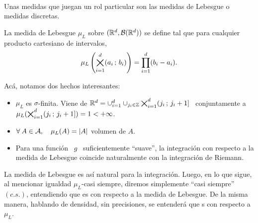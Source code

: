 \

Unas medidas que juegan un rol  particular son las medidas de Lebesgue o medidas
discretas.
%
\begin{definicion}
\label{Def:MP:Lebesgue}
%
  La medida de Lebesgue $\mu_L$  sobre $(\mathbb{R}^d,\mathcal{B}(\mathbb{R}^d))$ se define tal que
  para cualquier producto cartesiano de intervalos,
  \[
  \mu_L\left( \operatorname*{\bigtimes}_{i=1}^d (a_i \, ; \, b_i) \right) = \prod_{i=1}^d (b_i-a_i).
  \]
\end{definicion}
%
Ac\'a, notamos dos hechos interesantes:
%
\begin{itemize}
%
\item $\mu_L$ es $\sigma$-finita. Viene de $\mathbb{R}^d = \cup_{i=1}^d \cup_{j_i \in
    \mathbb{Z}}   \operatorname*{\bigtimes}_{i=1}^d    (   j_i   \, ; \,   j_i+1]$    \   conjuntamente   a
  $\mu_L(\operatorname*{\bigtimes}_{i=1}^d ( j_i \, ; \, j_i+1]) = 1 < +\infty$.
%
\item $\forall \:  A \in \mathcal{A}, \quad  \mu_L(A) = |A|$ volumen de $A$.
%
\item Para una funci\'on \ $g$ \ suficientemente ``suave'', la integraci\'on con
  respecto a la medida de Lebesgue coincide naturalmente con la integraci\'on de
  Riemann.
\end{itemize}
%
La medida de  Lebesgue es as\'i natural para la integraci\'on.  Luego, en lo que
sigue, al  mencionar igualdad  $\mu_L$-casi siempre, diremos  simplemente ``casi
siempre'' $(c.s.)$, entendiendo que es con  respecto a la medida de Lebesgue. De
la misma manera, hablando de densidad, sin precisiones, se entender\'a que s con
respecto a $\mu_L$.

